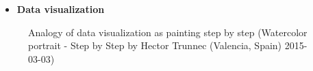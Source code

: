 \documentclass[
  ignorenonframetext,
]{beamer}
\providecommand{\tightlist}{%
  \setlength{\itemsep}{0pt}\setlength{\parskip}{0pt}}\usepackage{longtable,booktabs,array}
\begin{document}
\begin{frame}{}
\label{section-10}
\begin{itemize}
\tightlist
\item
  \textbf{Data visualization}
\end{itemize}

\begin{figure}


\caption{\label{fig-r-visualization-step-by-step}Analogy of data
visualization as painting step by step (Watercolor portrait - Step by
Step by Hector Trunnec (Valencia, Spain) 2015-03-03)}

\end{figure}%
\end{frame}
\end{document}
